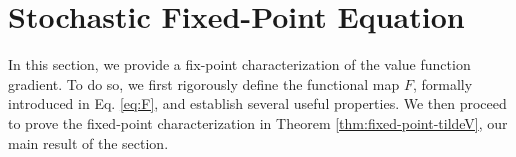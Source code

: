 \documentclass[11pt]{article}
\theoremstyle{definition}
\theoremstyle{plain}
\newcommand{\R}{\mathbb{R}}
\newcommand{\cH}{{\cal H}}
\newcommand{\tb}{\tilde{b}}
\begin{document}
\section{Stochastic Fixed-Point Equation}\label{sec:fixed-point-equation}
In this section, we provide a fix-point characterization of the value function gradient.  
To do so, we first rigorously define the functional map $F$, formally introduced in Eq. \eqref{eq:F}, 
and establish several useful properties. 
We then proceed to prove the fixed-point characterization in Theorem \ref{thm:fixed-point-tildeV}, our main result of the section. 
\end{document}
